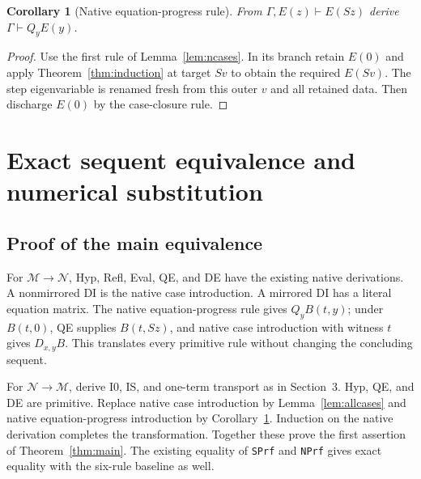 \documentclass[11pt]{article}
\newtheorem{corollary}[theorem]{Corollary}
\theoremstyle{definition}\newtheorem{definition}[theorem]{Definition}
\newcommand{\Mcal}{\mathcal M}
\newcommand{\Ncal}{\mathcal N}
\begin{document}
\begin{corollary}[Native equation-progress rule]\label{cor:qprogress}
From $\Gamma,E(z)\vdash E(Sz)$ derive $\Gamma\vdash Q_yE(y)$.
\end{corollary}
\begin{proof}
Use the first rule of Lemma~\ref{lem:ncases}. In its branch retain
$E(0)$ and apply Theorem~\ref{thm:induction} at target $Sv$ to obtain
the required $E(Sv)$. The step eigenvariable is renamed fresh from
this outer $v$ and all retained data. Then discharge $E(0)$ by the
case-closure rule.
\end{proof}

\section{Exact sequent equivalence and numerical substitution}

\subsection{Proof of the main equivalence}
For $\Mcal\to\Ncal$, Hyp, Refl, Eval, QE, and DE have the existing
native derivations. A nonmirrored DI is the native case introduction.
A mirrored DI has a literal equation matrix. The native equation-progress
rule gives $Q_yB(t,y)$; under $B(t,0)$, QE supplies $B(t,Sz)$, and
native case introduction with witness $t$ gives $D_{x,y}B$. This
translates every primitive rule without changing the concluding sequent.

For $\Ncal\to\Mcal$, derive I0, IS, and one-term transport as in
Section~3. Hyp, QE, and DE are primitive. Replace native case introduction
by Lemma~\ref{lem:allcases} and native equation-progress introduction by
Corollary~\ref{cor:qprogress}. Induction on the native derivation completes
the transformation. Together these prove the first assertion of
Theorem~\ref{thm:main}. The existing equality of \texttt{SPrf} and
\texttt{NPrf} gives exact equality with the six-rule baseline as well.
\end{document}
